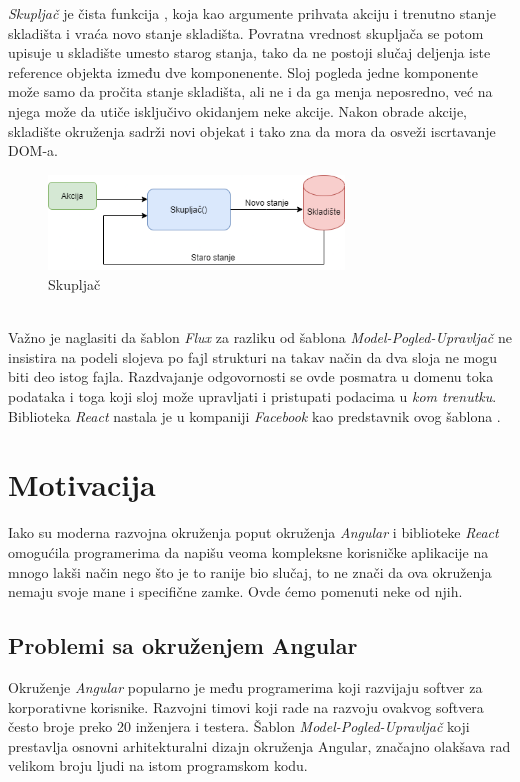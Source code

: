 \documentclass[12pt,oneside]{memoir}
\begin{document}
\emph{Skupljač} je čista funkcija \cite{functionalProgramming}, koja kao argumente
prihvata akciju i trenutno stanje skladišta i vraća novo stanje skladišta.
Povratna vrednost skupljača se potom upisuje u skladište umesto starog stanja, tako da ne postoji slučaj deljenja iste reference objekta
između dve komponenente. Sloj pogleda jedne komponente može samo da pročita stanje skladišta, ali ne i da ga menja neposredno, već na njega može da utiče
isključivo okidanjem neke akcije. Nakon obrade akcije, skladište okruženja sadrži novi objekat i tako zna da mora da osveži iscrtavanje DOM-a.
\begin{figure}[!ht]
  \centering
  \includegraphics[width=0.7\textwidth]{slike/Reducer.png}
  \caption{Skupljač}
  \label{fig:reducer}
\end{figure}
\\
Važno je naglasiti da šablon \emph{Flux} za razliku od šablona \emph{Model-Pogled-Upravljač} ne insistira
na podeli slojeva po fajl strukturi na takav način da dva sloja ne mogu biti deo istog fajla.
Razdvajanje odgovornosti se ovde posmatra u domenu toka podataka i toga koji sloj može
upravljati i pristupati podacima u \emph{kom trenutku}. Biblioteka \emph{React} nastala je u kompaniji \emph{Facebook} kao predstavnik ovog šablona \cite{React}.
\chapter{Motivacija}\label{chap:motivacija}
Iako su moderna razvojna okruženja poput okruženja \emph{Angular} i biblioteke \emph{React} omogućila
programerima da napišu veoma kompleksne korisničke aplikacije na mnogo lakši način nego što je to ranije bio slučaj,
to ne znači da ova okruženja nemaju svoje mane i specifične zamke. Ovde ćemo pomenuti neke od njih.
\section{Problemi sa okruženjem Angular}
Okruženje \emph{Angular} popularno je među programerima koji razvijaju softver za korporativne korisnike.
Razvojni timovi koji rade na razvoju ovakvog softvera često broje preko 20 inženjera i testera.
Šablon \emph{Model-Pogled-Upravljač} koji prestavlja osnovni arhitekturalni dizajn okruženja Angular,
značajno olakšava rad velikom broju ljudi na istom programskom kodu.
\end{document}
